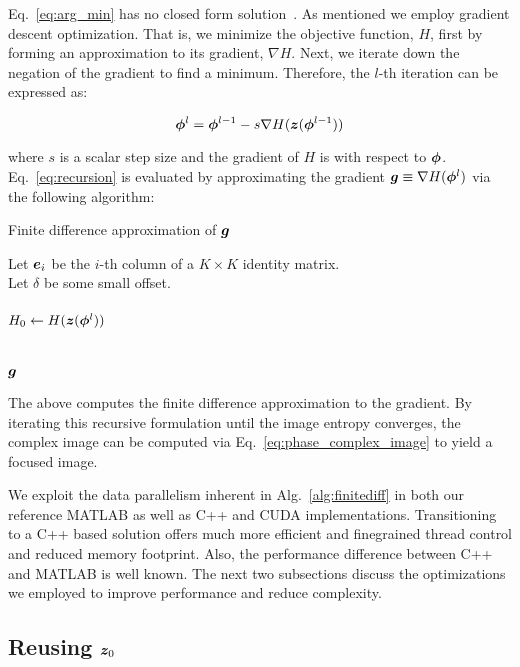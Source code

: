 Eq.~\ref{eq:arg_min} has no closed form solution~\cite{ash2012autofocus}. As
mentioned we employ gradient descent optimization. That is, we minimize the
objective function, $H$, first by forming an approximation to its gradient,
$\nabla H$. Next, we iterate down the negation of the gradient to find a
minimum. Therefore, the $l$-th iteration can be expressed as:

\begin{equation}\label{eq:recursion}
  \bm{\phi}^l = \bm{\phi}^{l-1} - s \nabla H(\bm{z}(\bm{\phi}^{l-1}))
\end{equation}

where $s$ is a scalar step size and the gradient of $H$ is with respect to
$\bm{\phi}$. Eq.~\ref{eq:recursion} is evaluated by approximating the gradient
$\bm{g} \equiv \nabla H(\bm{\phi}^{l})$ via the following algorithm:

\begin{algorithm}
  \caption{Finite difference approximation of $\bm{g}$}
  \label{alg:finitediff}
  Let $\bm{e}_i$ be the $i$-th column of a $K \times K$ identity matrix.\\
  Let $\delta$ be some small offset.\\
  \ \\
  $H_0 \gets H(\bm{z}(\bm{\phi}^l))$\\
  \ \\
  \ \\
  \Return $\bm{g}$
  \vspace{5 mm}
\end{algorithm}

The above computes the finite difference approximation to the gradient. By
iterating this recursive formulation until the image entropy converges, the
complex image can be computed via Eq.~\ref{eq:phase_complex_image} to yield a
focused image.

We exploit the data parallelism inherent in Alg.~\ref{alg:finitediff} in both
our reference MATLAB as well as C++ and CUDA implementations. Transitioning to a
C++ based solution offers much more efficient and finegrained thread control and
reduced memory footprint. Also, the performance difference between C++ and
MATLAB is well known. The next two subsections discuss the optimizations we
employed to improve performance and reduce complexity. 
 
\subsection{Reusing $\bm{z}_{0}$}

